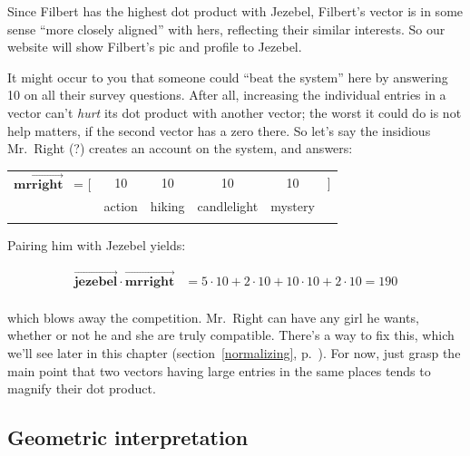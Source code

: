 Since Filbert has the highest dot product with Jezebel, Filbert's vector is in
some sense ``more closely aligned'' with hers, reflecting their similar
interests. So our website will show Filbert's pic and profile to Jezebel.

\medskip


It might occur to you that someone could ``beat the system'' here by answering
10 on all their survey questions. After all, increasing the individual entries
in a vector can't \textit{hurt} its dot product with another vector; the worst
it could do is not help matters, if the second vector has a zero there. So
let's say the insidious Mr.~Right (?) creates an account on the system, and
answers:

\begin{center}
\begin{tabular}{cccccc}
$\overrightarrow{\textbf{mrright}}$ \quad \ = [ & 10 & 10 & 10 & 10 & ] \\
& \scriptsize{action} & \scriptsize{hiking} & \scriptsize{candlelight} &
\scriptsize{mystery} & \medskip \\
\normalsize
\end{tabular}
\end{center}
\vspace{-.15in}

Pairing him with Jezebel yields:

\vspace{-.15in}
\begin{align*}
\overrightarrow{\textbf{jezebel}} \cdot \overrightarrow{\textbf{mrright}} &=
5 \cdot 10 + 2 \cdot 10 + 10 \cdot 10 + 2 \cdot 10 = 190 \\
\end{align*}
\vspace{-.25in}

which blows away the competition. Mr.~Right can have any girl he wants, whether
or not he and she are truly compatible. There's a way to fix this, which we'll
see later in this chapter (section~\ref{normalizing},
p.~\pageref{normalizing}). For now, just grasp the main point that two vectors
having large entries in the same places tends to magnify their dot product.

\bigskip
\bigskip
\phantom{.}

\subsection{Geometric interpretation}

